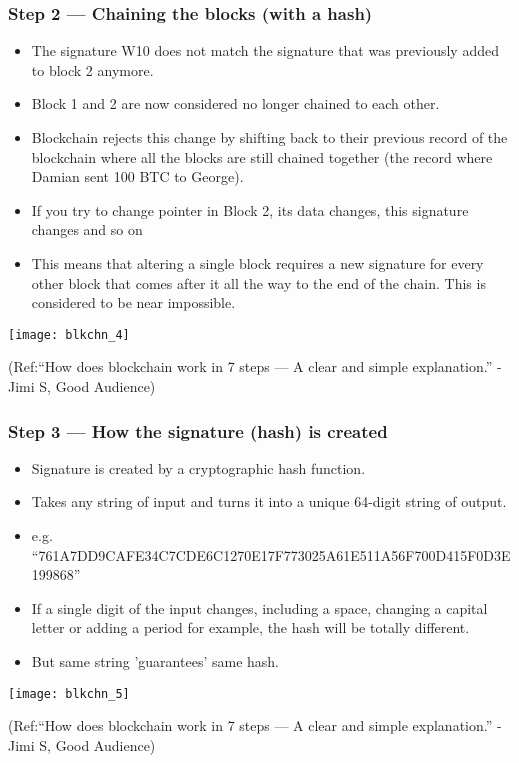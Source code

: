 \begin{frame}[fragile]\frametitle{Step 2 — Chaining the blocks (with a hash)}
\begin{itemize}
\item The signature W10 does not match the signature that was previously added to block 2 anymore. 
\item Block 1 and 2 are now considered no longer chained to each other. 
\item Blockchain rejects this change by shifting back to their previous record of the blockchain where all the blocks are still chained together (the record where Damian sent 100 BTC to George).
\item If you try to change pointer in Block 2, its data changes, this signature changes and so on
\item This means that altering a single block requires a new signature for every other block that comes after it all the way to the end of the chain. This is considered to be near impossible.
\end{itemize}

\begin{center}
\texttt{[image: blkchn\_4]}

{\tiny (Ref:``How does blockchain work in 7 steps — A clear and simple explanation.'' - Jimi S, Good Audience)}
\end{center}

\end{frame}

\begin{frame}[fragile]\frametitle{Step 3 — How the signature (hash) is created}
\begin{itemize}
\item Signature is created by a cryptographic hash function. 
\item Takes any string of input and turns it into a unique 64-digit string of output.
\item e.g. ``761A7DD9CAFE34C7CDE6C1270E17F773025A61E511A56F700D415F0D3E199868''
\item If a single digit of the input changes, including a space, changing a capital letter or adding a period for example, the hash will be totally different.
\item But same string 'guarantees' same hash.
\end{itemize}

\begin{center}
\texttt{[image: blkchn\_5]}

{\tiny (Ref:``How does blockchain work in 7 steps — A clear and simple explanation.'' - Jimi S, Good Audience)}
\end{center}

\end{frame}


